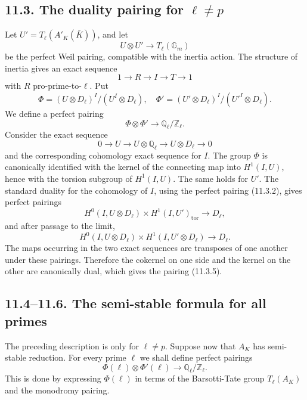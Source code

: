 \documentclass[11pt]{article}
\newcommand{\Ql}{\mathbb Q_\ell}
\newcommand{\Gm}{\mathbb G_m}
\newcommand{\tor}{\operatorname{tor}}
\newcommand{\Dl}{D_\ell}
\newcommand{\QlZl}{\mathbb Q_\ell/\mathbb Z_\ell}
\begin{document}
\subsection*{11.3. The duality pairing for \(\ell\ne p\)}
Let \(U'=T_\ell(A'_K(\bar K))\), and let
\begin{equation}\tag{11.3.2}
        U\otimes U'\longrightarrow T_\ell(\Gm)
\end{equation}
be the perfect Weil pairing, compatible with the inertia action.  The structure of inertia gives an exact sequence
\begin{equation}\tag{11.3.3}
        1\longrightarrow R\longrightarrow I\longrightarrow T\longrightarrow1
\end{equation}
with \(R\) pro-prime-to-\(\ell\).  Put
\begin{equation}\tag{11.3.4}
        \Phi=(U\otimes\Dl)^I/(U^I\otimes\Dl),
        \quad
        \Phi'=(U'\otimes\Dl)^I/(U'^I\otimes\Dl).
\end{equation}
We define a perfect pairing
\begin{equation}\tag{11.3.5}
        \Phi\otimes\Phi'\longrightarrow \QlZl.
\end{equation}
Consider the exact sequence
\begin{equation}\tag{11.3.6}
        0\to U\to U\otimes\Ql\to U\otimes\Dl\to0
\end{equation}
and the corresponding cohomology exact sequence for \(I\).  The group \(\Phi\) is canonically identified with the kernel of the connecting map into \(H^1(I,U)\), hence with the torsion subgroup of \(H^1(I,U)\).  The same holds for \(U'\).  The standard duality for the cohomology of \(I\), using the perfect pairing (11.3.2), gives perfect pairings
\begin{equation}\tag{11.3.12}
        H^0(I,U\otimes\Dl)\times H^1(I,U')_{\tor}\longrightarrow\Dl,
\end{equation}
and after passage to the limit,
\begin{equation}\tag{11.3.13}
        H^0(I,U\otimes\Dl)\times H^1(I,U'\otimes\Dl)\longrightarrow\Dl.
\end{equation}
The maps occurring in the two exact sequences are transposes of one another under these pairings.  Therefore the cokernel on one side and the kernel on the other are canonically dual, which gives the pairing (11.3.5).

\subsection*{11.4--11.6. The semi-stable formula for all primes}
The preceding description is only for \(\ell\ne p\).  Suppose now that \(A_K\) has semi-stable reduction.  For every prime \(\ell\) we shall define perfect pairings
\begin{equation}\tag{11.4.1}
        \Phi(\ell)\otimes\Phi'(\ell)\longrightarrow \QlZl.
\end{equation}
This is done by expressing \(\Phi(\ell)\) in terms of the Barsotti-Tate group \(T_\ell(A_K)\) and the monodromy pairing.
\end{document}
